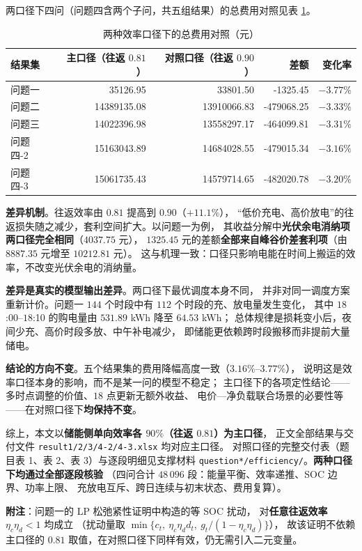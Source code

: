 两口径下四问（问题四含两个子问，共五组结果）的总费用对照见表 \ref{tab:eff-cost}。

\begin{table}[H]
\centering
\caption{两种效率口径下的总费用对照（元）}
\label{tab:eff-cost}
\begin{tabular}{@{}l r r r r@{}}
\toprule
结果集 & {主口径（往返 $0.81$）} & {对照口径（往返 $0.90$）} & 差额 & 变化率 \\
\midrule
问题一     & 35126.95    & 33801.50     & -1325.45    & $-3.77\%$ \\
问题二     & 14389135.08 & 13910066.83  & -479068.25  & $-3.33\%$ \\
问题三     & 14022396.98 & 13558297.17  & -464099.81  & $-3.31\%$ \\
问题四-2   & 15163043.89 & 14684028.55  & -479015.34  & $-3.16\%$ \\
问题四-3   & 15061735.43 & 14579714.65  & -482020.78  & $-3.20\%$ \\
\bottomrule
\end{tabular}
\end{table}

\textbf{差异机制}。往返效率由 $0.81$ 提高到 $0.90$（$+11.1\%$），
“低价充电、高价放电”的往返损失随之减少，套利空间扩大。以问题一为例，
其收益分解中\textbf{光伏余电消纳项两口径完全相同}（$4037.75$ 元），
$1325.45$ 元的差额\textbf{全部来自峰谷价差套利项}（由 $8887.35$ 元增至 $10212.81$ 元）。
这与机理一致：口径只影响电能在时间上搬运的效率，不改变光伏余电的消纳量。

\textbf{差异是真实的模型输出差异}。两口径下最优调度本身不同，
并非对同一调度方案重新计价。问题一 $144$ 个时段中有 $112$ 个时段的充、放电量发生变化，
其中 $18$:00--$18$:10 的购电量由 $531.89$ kWh 降至 $64.53$ kWh；
总体规律是损耗变小后，夜间少充、高价时段多放、中午补电减少，
即储能更依赖跨时段搬移而非提前大量储电。

\textbf{结论的方向不变}。五个结果集的费用降幅高度一致（$3.16\%$--$3.77\%$），
说明这是效率口径本身的影响，而不是某一问的模型不稳定；
主口径下的各项定性结论——多时点调整的价值、$18$ 点更新无额外收益、
电价—净负载联合场景的必要性等——在对照口径下\textbf{均保持不变}。

综上，本文以\textbf{储能侧单向效率各 $90\%$（往返 $0.81$）为主口径}，
正文全部结果与交付文件 \texttt{result1/2/3/4-2/4-3.xlsx} 均对应主口径。
对照口径的完整交付表（题目表 1、表 2、表 3）与逐段明细见支撑材料
\texttt{question*/efficiency/}。\textbf{两种口径下均通过全部逐段核验}
（四问合计 $48\,096$ 段：能量平衡、效率递推、SOC 边界、功率上限、
充放电互斥、跨日连续与初末状态、费用复算）。

\noindent\textbf{附注}：问题一的 LP 松弛紧性证明中构造的等 SOC 扰动，
对\textbf{任意往返效率} $\eta_c\eta_d<1$ 均成立
（扰动量取 $\min\{c_t,\ \eta_c\eta_d d_t,\ g_t/(1-\eta_c\eta_d)\}$），
故该证明不依赖主口径的 $0.81$ 取值，在对照口径下同样有效，仍无需引入二元变量。
